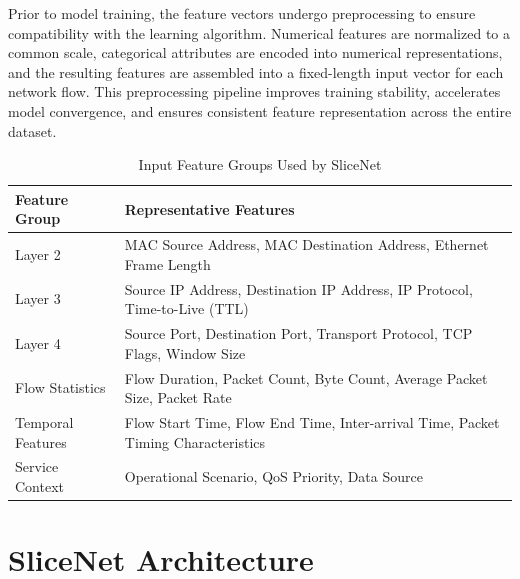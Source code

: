 \documentclass[12pt,a4paper]{report}
\begin{document}
	Prior to model training, the feature vectors undergo preprocessing to ensure compatibility with the learning algorithm. Numerical features are normalized to a common scale, categorical attributes are encoded into numerical representations, and the resulting features are assembled into a fixed-length input vector for each network flow. This preprocessing pipeline improves training stability, accelerates model convergence, and ensures consistent feature representation across the entire dataset.
	
	
	
	\begin{table}[H]
		\centering
		\caption{Input Feature Groups Used by SliceNet}
		\label{tab:input_features}
		
		\begin{tabular}{|p{5cm}|p{9cm}|}
			\hline
			
			\textbf{Feature Group} &
			\textbf{Representative Features}
			\\
			\hline
			
			Layer 2 &
			MAC Source Address, MAC Destination Address, Ethernet Frame Length
			\\
			\hline
			
			Layer 3 &
			Source IP Address, Destination IP Address, IP Protocol, Time-to-Live (TTL)
			\\
			\hline
			
			Layer 4 &
			Source Port, Destination Port, Transport Protocol, TCP Flags, Window Size
			\\
			\hline
			
			Flow Statistics &
			Flow Duration, Packet Count, Byte Count, Average Packet Size, Packet Rate
			\\
			\hline
			
			Temporal Features &
			Flow Start Time, Flow End Time, Inter-arrival Time, Packet Timing Characteristics
			\\
			\hline
			
			Service Context &
			Operational Scenario, QoS Priority, Data Source
			\\
			\hline
			
		\end{tabular}
		
	\end{table}
	
	\section{SliceNet Architecture}
	\label{sec:architecture}
	
\end{document}
